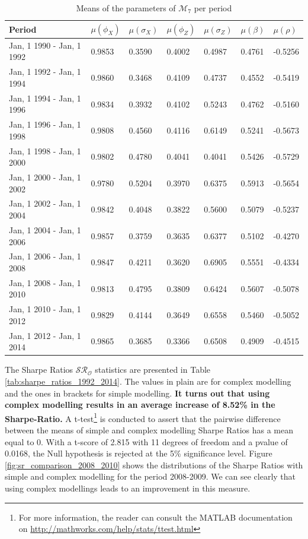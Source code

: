 \documentclass[11pt,a4,twosided,singlespacing,titlepagenumber=on]{scrreprt}
\numberwithin{equation}{chapter} %
\theoremstyle{remark}
\begin{document}
\renewcommand{\arraystretch}{0.9}%
\begin{table}[H]
\centering
\begin{tabular}{lllllll}
\hline
\multicolumn{1}{|l|}{Period} & \multicolumn{1}{|l|}{$\mu(\phi_X)$} & \multicolumn{1}{|l|}{$\mu(\sigma_X)$} & \multicolumn{1}{|l|}{$\mu(\phi_Z)$} & \multicolumn{1}{|l|}{$\mu(\sigma_Z)$} & \multicolumn{1}{|l|}{$\mu(\beta)$} & \multicolumn{1}{|l|}{$\mu(\rho)$} \\ \hline
Jan, 1 1990 - Jan, 1 1992 &  0.9853 & 0.3590 & 0.4002 & 0.4987 & 0.4761 & -0.5256 \\
Jan, 1 1992 - Jan, 1 1994 &  0.9860 & 0.3468 & 0.4109 & 0.4737 & 0.4552 & -0.5419 \\ 
Jan, 1 1994 - Jan, 1 1996 &  0.9834 & 0.3932 & 0.4102 & 0.5243 & 0.4762 & -0.5160 \\
Jan, 1 1996 - Jan, 1 1998 &  0.9808 & 0.4560 & 0.4116 & 0.6149 & 0.5241 & -0.5673 \\
Jan, 1 1998 - Jan, 1 2000 &  0.9802 & 0.4780 & 0.4041 & 0.4041 & 0.5426 & -0.5729 \\
Jan, 1 2000 - Jan, 1 2002 &  0.9780 & 0.5204 & 0.3970 & 0.6375 & 0.5913 & -0.5654 \\
Jan, 1 2002 - Jan, 1 2004 &  0.9842 & 0.4048 & 0.3822 & 0.5600 & 0.5079 & -0.5237 \\
Jan, 1 2004 - Jan, 1 2006 &  0.9857 & 0.3759 & 0.3635 & 0.6377 & 0.5102 & -0.4270 \\
Jan, 1 2006 - Jan, 1 2008 &  0.9847 & 0.4211 & 0.3620 & 0.6905 & 0.5551 & -0.4334 \\
Jan, 1 2008 - Jan, 1 2010 &  0.9813 & 0.4795 & 0.3809 & 0.6424 & 0.5607 & -0.5078 \\
Jan, 1 2010 - Jan, 1 2012 &  0.9829 & 0.4144 & 0.3649 & 0.6558 & 0.5460 & -0.5052\\
Jan, 1 2012 - Jan, 1 2014 &  0.9865 & 0.3685 & 0.3366 & 0.6508 & 0.4909 & -0.4515\\
\hline
\end{tabular}
\caption{Means of the parameters of $\mathcal{M}_7$ per period}
\label{tab:param_stats_1992_2014}
\end{table}

The Sharpe Ratios $\mathcal{SR}_\mathcal{O}$ statistics are presented in Table \ref{tab:sharpe_ratios_1992_2014}. The values in plain are for complex modelling and the ones in brackets for simple modelling. \textbf{It turns out that using complex modelling results in an average increase of 8.52\% in the Sharpe-Ratio.} A t-test\footnote{For more information, the reader can consult the MATLAB documentation on \url{http://mathworks.com/help/stats/ttest.html}} is conducted to assert that the pairwise difference between the means of simple and complex modelling Sharpe Ratios has a mean equal to 0. With a t-score of 2.815 with 11 degrees of freedom and a pvalue of 0.0168, the Null hypothesis is rejected at the 5\% significance level. Figure \ref{fig:sr_comparison_2008_2010} shows the distributions of the Sharpe Ratios with simple and complex modelling for the period 2008-2009. We can see clearly that using complex modellings leads to an improvement in this measure.
\end{document}
